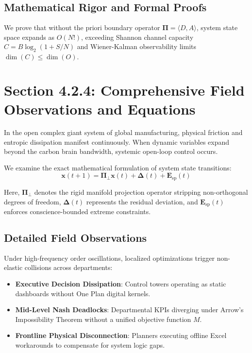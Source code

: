 \documentclass[12pt,a4paper,oneside]{book}
\begin{document}
\subsection*{Mathematical Rigor and Formal Proofs}
We prove that without the priori boundary operator $\mathbf{\Pi} = \langle D, A \rangle$, system state space expands as $O(N!)$, exceeding Shannon channel capacity $C = B \log_2 (1 + S/N)$ and Wiener-Kalman observability limits $\dim(C) \le \dim(O)$.
\clearpage
\section{Section 4.2.4: Comprehensive Field Observations and Equations}

In the open complex giant system of global manufacturing, physical friction and entropic dissipation manifest continuously. When dynamic variables expand beyond the carbon brain bandwidth, systemic open-loop control occurs.

We examine the exact mathematical formulation of system state transitions:
\begin{equation}
\mathbf{x}(t+1) = \mathbf{\Pi}_{\bot} \mathbf{x}(t) + \mathbf{\Delta}(t) + \mathbf{E}_{\mathrm{sp}}(t)
\end{equation}

Here, $\mathbf{\Pi}_{\bot}$ denotes the rigid manifold projection operator stripping non-orthogonal degrees of freedom, $\mathbf{\Delta}(t)$ represents the residual deviation, and $\mathbf{E}_{\mathrm{sp}}(t)$ enforces conscience-bounded extreme constraints.

\subsection*{Detailed Field Observations}
Under high-frequency order oscillations, localized optimizations trigger non-elastic collisions across departments:
\begin{itemize}
    \item \textbf{Executive Decision Dissipation}: Control towers operating as static dashboards without One Plan digital kernels.
    \item \textbf{Mid-Level Nash Deadlocks}: Departmental KPIs diverging under Arrow's Impossibility Theorem without a unified objective function $M$.
    \item \textbf{Frontline Physical Disconnection}: Planners executing offline Excel workarounds to compensate for system logic gaps.
\end{itemize}
\end{document}

